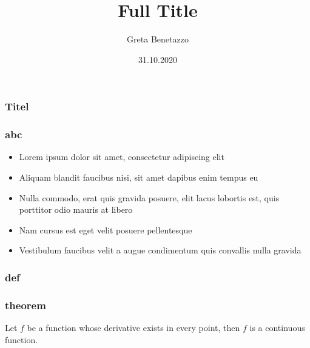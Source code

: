 \documentclass[10pt]{beamer}
\title[Short title]{Full Title}
\author{Greta Benetazzo}
\institute[UZH]
{
University of Zurich}
\date{31.10.2020}
\begin{document}
\begin{frame}
\titlepage
\end{frame}


\begin{frame}
\frametitle{Titel}
\end{frame}


\begin{frame}
\frametitle{abc}
\begin{itemize}
\item Lorem ipsum dolor sit amet, consectetur adipiscing elit
\item Aliquam blandit faucibus nisi, sit amet dapibus enim tempus eu
\item Nulla commodo, erat quis gravida posuere, elit lacus lobortis est, quis porttitor odio mauris at libero
\item Nam cursus est eget velit posuere pellentesque
\item Vestibulum faucibus velit a augue condimentum quis convallis nulla gravida
\end{itemize}
\end{frame}


\begin{frame}
\frametitle{def}
\end{frame}

\begin{frame}
\frametitle{theorem}
\begin{theorem}
	Let \(f\) be a function whose derivative exists in every point, then \(f\) 
is a continuous function.
\end{theorem}

\end{frame}
\end{document}
